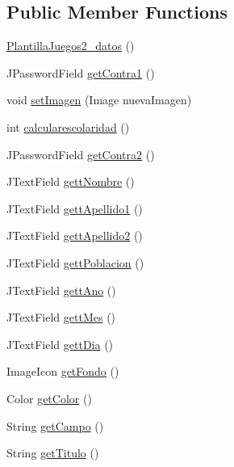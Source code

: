 \subsection*{Public Member Functions}
\begin{DoxyCompactItemize}
\item 
\mbox{\hyperlink{classdiagnostico_1_1_plantilla_juegos2__datos_a8bca8ff60e3c597803a02ac2dd3393ea}{Plantilla\+Juegos2\+\_\+datos}} ()
\item 
J\+Password\+Field \mbox{\hyperlink{classdiagnostico_1_1_plantilla_juegos2__datos_ad4aa8839c5916eff86ffcc43b9bf63ea}{get\+Contra1}} ()
\item 
void \mbox{\hyperlink{classdiagnostico_1_1_plantilla_juegos2__datos_ac92aea56aa83ec039dab3140db03574a}{set\+Imagen}} (Image nueva\+Imagen)
\item 
int \mbox{\hyperlink{classdiagnostico_1_1_plantilla_juegos2__datos_a9f59c790e2208528d47445aed90256c1}{calcularescolaridad}} ()
\item 
J\+Password\+Field \mbox{\hyperlink{classdiagnostico_1_1_plantilla_juegos2__datos_a8a44fcf6cb811e92876ba56a87bdb993}{get\+Contra2}} ()
\item 
J\+Text\+Field \mbox{\hyperlink{classdiagnostico_1_1_plantilla_juegos2__datos_aa4d842ca0f5d984d711021b716d9c56c}{gett\+Nombre}} ()
\item 
J\+Text\+Field \mbox{\hyperlink{classdiagnostico_1_1_plantilla_juegos2__datos_a25edf0b29bf5119231f4be6117274bf5}{gett\+Apellido1}} ()
\item 
J\+Text\+Field \mbox{\hyperlink{classdiagnostico_1_1_plantilla_juegos2__datos_a7848190eb3bf7e945e73644a32ac1aaa}{gett\+Apellido2}} ()
\item 
J\+Text\+Field \mbox{\hyperlink{classdiagnostico_1_1_plantilla_juegos2__datos_a71915b1ca04d3d1e6b03a969fb7965fb}{gett\+Poblacion}} ()
\item 
J\+Text\+Field \mbox{\hyperlink{classdiagnostico_1_1_plantilla_juegos2__datos_a27bb049ce1406c8a980b4d085c860e07}{gett\+Ano}} ()
\item 
J\+Text\+Field \mbox{\hyperlink{classdiagnostico_1_1_plantilla_juegos2__datos_a04262c082bc21cf6384b463b7eebe216}{gett\+Mes}} ()
\item 
J\+Text\+Field \mbox{\hyperlink{classdiagnostico_1_1_plantilla_juegos2__datos_ac40208d093afd3f07677008d156da02a}{gett\+Dia}} ()
\item 
Image\+Icon \mbox{\hyperlink{classdiagnostico_1_1_plantilla_juegos2__datos_a222f47330c8cafd6c2ac530ba76de966}{get\+Fondo}} ()
\item 
Color \mbox{\hyperlink{classdiagnostico_1_1_plantilla_juegos2__datos_aea3f6f5738b825f63c0f7fa42c44a75c}{get\+Color}} ()
\item 
String \mbox{\hyperlink{classdiagnostico_1_1_plantilla_juegos2__datos_aa96548941fd36805b898afcd34633b7d}{get\+Campo}} ()
\item 
String \mbox{\hyperlink{classdiagnostico_1_1_plantilla_juegos2__datos_a4381962b053c27b5778fa5a506040628}{get\+Titulo}} ()
\end{DoxyCompactItemize}
